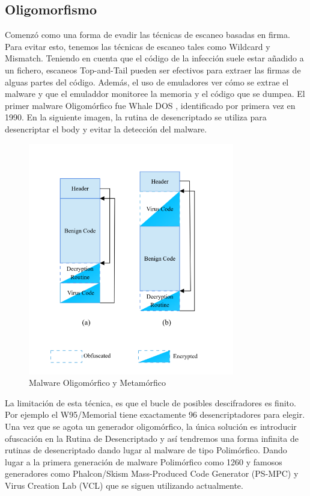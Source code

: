 \documentclass[15pt]{article}
\begin{document}
	
	\subsection{Oligomorfismo}
	
	Comenzó como una forma de evadir las técnicas de escaneo basadas en firma. Para evitar esto, tenemos las técnicas de escaneo tales como Wildcard y Mismatch. Teniendo en cuenta que el código de la infección suele estar añadido a un fichero, escaneos Top-and-Tail pueden ser efectivos para extraer las firmas de alguas partes del código. Además, el uso de emuladores ver cómo se extrae el malware y que el emuladdor monitoree la memoria y el código que se dumpea. El primer malware Oligomórfico fue Whale DOS \cite{whale}, identificado por primera vez en 1990. En la siguiente imagen, la rutina de desencriptado se utiliza para desencriptar el body y evitar la detección del malware.
	
	\begin{figure}[H]
		\centering
		\includegraphics[width=9cm]{images/oligomorphism.png}
		\caption{Malware Oligomórfico y Metamórfico}
	\end{figure}	

	La limitación de esta técnica, es que el bucle de posibles descifradores es finito. Por ejemplo el W95/Memorial \cite{memorial} tiene exactamente 96 desencriptadores para elegir. Una vez que se agota un generador oligomórfico, la única solución es introducir ofuscación en la Rutina de Desencriptado y así tendremos una forma infinita de rutinas de desencriptado dando lugar al malware de tipo Polimórfico. Dando lugar a la primera generación de malware Polimórfico como 1260 \cite{1260} y famosos generadores como Phalcon/Skism Mass-Produced Code Generator (PS-MPC) \cite{psmpc} y Virus Creation Lab (VCL)\cite{vcl} que se siguen utilizando actualmente.
	
\end{document}
